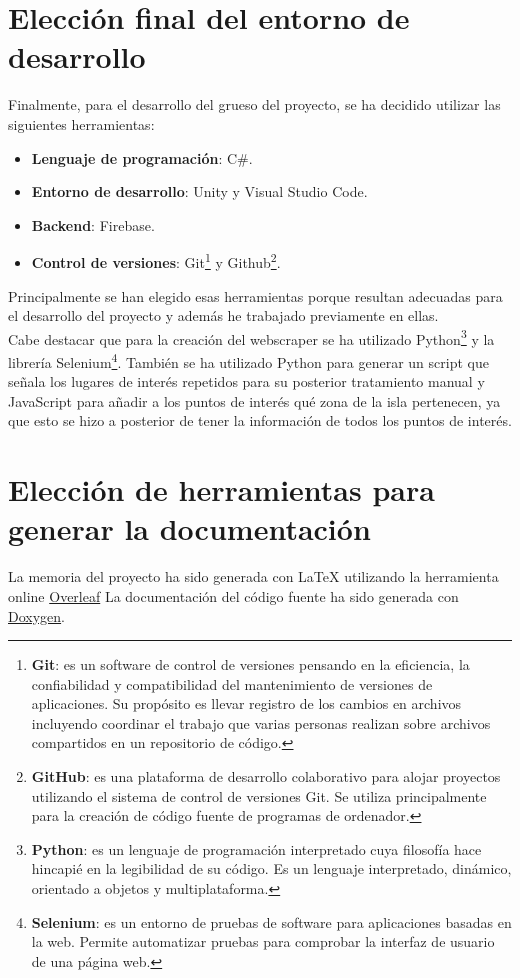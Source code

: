 \documentclass{report}
\begin{document}
\section{Elección final del entorno de desarrollo}
Finalmente, para el desarrollo del grueso del proyecto, se ha decidido utilizar las siguientes herramientas:
\begin{itemize}
\item \textbf{Lenguaje de programación}: C\#.
\item \textbf{Entorno de desarrollo}: Unity y Visual Studio Code.
\item \textbf{Backend}: Firebase.
\item \textbf{Control de versiones}: Git\footnote{\textbf{Git}: es un software de control de versiones pensando en la eficiencia, la confiabilidad y compatibilidad del mantenimiento de versiones de aplicaciones. Su propósito es llevar registro de los cambios en archivos incluyendo coordinar el trabajo que varias personas realizan sobre archivos compartidos en un repositorio de código.} y Github\footnote{\textbf{GitHub}: es una plataforma de desarrollo colaborativo para alojar proyectos utilizando el sistema de control de versiones Git. Se utiliza principalmente para la creación de código fuente de programas de ordenador.}.
\end{itemize}
Principalmente se han elegido esas herramientas porque resultan adecuadas para el desarrollo del proyecto y además he trabajado previamente en ellas. \\
Cabe destacar que para la creación del webscraper se ha utilizado Python\footnote{\textbf{Python}: es un lenguaje de programación interpretado cuya filosofía hace hincapié en la legibilidad de su código. Es un lenguaje interpretado, dinámico, orientado a objetos y multiplataforma.} y la librería Selenium\footnote{\textbf{Selenium}: es un entorno de pruebas de software para aplicaciones basadas en la web. Permite automatizar pruebas para comprobar la interfaz de usuario de una página web.}. También se ha utilizado Python para generar un script que señala los lugares de interés repetidos para su posterior tratamiento manual y JavaScript para añadir a los puntos de interés qué zona de la isla pertenecen, ya que esto se hizo a posterior de tener la información de todos los puntos de interés.

\section{Elección de herramientas para generar la documentación}
La memoria del proyecto ha sido generada con \LaTeX{} utilizando la herramienta online \href{http://www.overleaf.com}{Overleaf}
La documentación del código fuente ha sido generada con \href{https://www.doxygen.nl/index.html}{Doxygen}.
\end{document}

